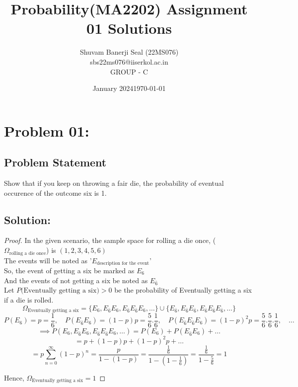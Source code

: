 \documentclass{article}
\title{Probability(MA2202) Assignment 01 Solutions}
\author{Shuvam Banerji Seal (22MS076)\\ \small sbs22ms076@iiserkol.ac.in \\ GROUP - C}
\date{January 2024}
\date{\today} %
\theoremstyle{definition}
\begin{document}
\maketitle
\tableofcontents

\section{Problem 01:}
\begin{mdframed}[style = MyFrame]
\subsection{Problem Statement}
    Show that if you keep on throwing a fair die, the probability of eventual occurence of the outcome
six is 1.
\end{mdframed}

\subsection{Solution:}
\begin{proof}
    In the given scenario, the sample space for rolling a die once, ($\Omega_{\text{rolling a die once}}$) is $(1,2,3,4,5,6)$\\
The events will be noted as '$E_{\text{description for the event}}$'\\
So, the event of getting a six be marked as $E_6$ \\
 And the events of not getting a six be noted as $E_{\bar 6}$\\
Let $P(\text{Eventually getting a six)} > 0$ be the probability of Eventually getting a six if a die is rolled. 
    \[ \Omega_{\text{Eventually getting a six}} = \{ E_6,E_{\bar 6}E_6,E_{\bar 6}E_{\bar 6}E_6, \dots \} \cup \{E_{\bar 6}, E_{\bar 6}E_{\bar 6},E_{\bar 6}E_{\bar 6}E_{\bar 6}, \dots\} \]     
    \[ P(E_6) = p =\frac{1}{6}, \quad P(E_{\bar 6}E_6) = (1-p)p = \frac{5}{6}.\frac{1}{6}, \quad P(E_{\bar 6}E_{\bar 6}E_6) = (1-p)^2p = \frac{5}{6}.\frac{5}{6}.\frac{1}{6},\quad \dots \]
    \[\implies P( E_6,E_{\bar 6}E_6,E_{\bar 6}E_{\bar 6}E_6, \dots) = P(E_6) + P(E_{\bar 6}E_6) + \dots \]
    \[ = p + (1-p)p + (1-p)^2p + \dots \]
    \[ = p \sum_{n=0}^{\infty} (1-p)^n = \frac{p}{1-(1-p)} = \frac{\frac{1}{6}}{1-(1-\frac{1}{6})} = \frac{\frac{1}{6}}{1-\frac{5}{6}} =1\]

    Hence, $\Omega_{\text{Eventually getting a six}} = 1$
\end{proof}
\vspace{0.5cm}
\end{document}
